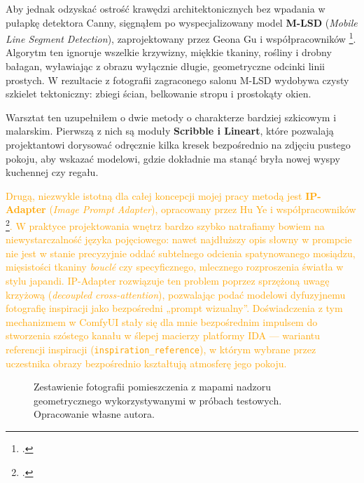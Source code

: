 Aby jednak odzyskać ostrość krawędzi architektonicznych bez wpadania w pułapkę detektora Canny, sięgnąłem po wyspecjalizowany model \textbf{M-LSD} (\emph{Mobile Line Segment Detection}), zaprojektowany przez Geona Gu i współpracowników \footcite{gu2022mlsd}. Algorytm ten ignoruje wszelkie krzywizny, miękkie tkaniny, rośliny i drobny bałagan, wyławiając z obrazu wyłącznie długie, geometryczne odcinki linii prostych. W rezultacie z fotografii zagraconego salonu M-LSD wydobywa czysty szkielet tektoniczny: zbiegi ścian, belkowanie stropu i prostokąty okien.

Warsztat ten uzupełniłem o dwie metody o charakterze bardziej szkicowym i malarskim. Pierwszą z nich są moduły \textbf{Scribble i Lineart}, które pozwalają projektantowi dorysować odręcznie kilka kresek bezpośrednio na zdjęciu pustego pokoju, aby wskazać modelowi, gdzie dokładnie ma stanąć bryła nowej wyspy kuchennej czy regału.

\textcolor{orange}{Drugą, niezwykle istotną dla całej koncepcji mojej pracy metodą jest \textbf{IP-Adapter} (\emph{Image Prompt Adapter}), opracowany przez Hu Ye i współpracowników \footcite{ye2023ipadapter}. W praktyce projektowania wnętrz bardzo szybko natrafiamy bowiem na niewystarczalność języka pojęciowego: nawet najdłuższy opis słowny w prompcie nie jest w stanie precyzyjnie oddać subtelnego odcienia spatynowanego mosiądzu, mięsistości tkaniny \emph{bouclé} czy specyficznego, mlecznego rozproszenia światła w stylu japandi. IP-Adapter rozwiązuje ten problem poprzez sprzężoną uwagę krzyżową (\emph{decoupled cross-attention}), pozwalając podać modelowi dyfuzyjnemu fotografię inspiracji jako bezpośredni „prompt wizualny”. Doświadczenia z tym mechanizmem w ComfyUI stały się dla mnie bezpośrednim impulsem do stworzenia szóstego kanału w ślepej macierzy platformy IDA --- wariantu referencji inspiracji (\texttt{inspiration\_reference}), w którym wybrane przez uczestnika obrazy bezpośrednio kształtują atmosferę jego pokoju.}

\begin{figure}[htbp]
  \centering
  \caption{Zestawienie fotografii pomieszczenia z mapami nadzoru geometrycznego wykorzystywanymi w próbach testowych.
  Opracowanie własne autora.}
  \label{fig:ch04:depth}
\end{figure}

